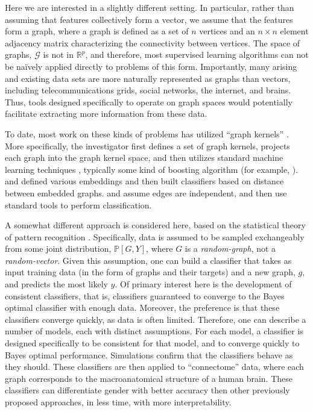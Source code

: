 \documentclass[10pt,journal,cspaper,compsoc]{IEEEtran}
\providecommand{\mc}[1]{\mathcal{#1}}
\newcommand{\Real}{\mathbb{R}}
\newcommand{\PP}{\mathbb{P}}
\begin{document}
Here we are interested in a slightly different setting.  In particular, rather than assuming that features collectively form a vector, we assume that the features form a graph, where a graph is defined as a set of $n$ vertices and an $n \times n$ element adjacency matrix characterizing the connectivity between vertices.  The space of graphs, $\mc{G}$ is not in $\Real^p$, and therefore, most supervised learning algorithms can not be na\"{i}vely applied directly to problems of this form.  Importantly, many arising and existing data sets are more naturally represented as graphs than vectors, including telecommunications grids, social networks, the internet, and brains.  Thus, tools designed specifically to operate on graph spaces would potentially facilitate extracting more information from these data.

To date, most work on these kinds of problems has utilized ``graph kernels'' \cite{Gartner03}.  More specifically, the investigator first defines a set of graph kernels, projects each graph into the graph kernel space, and then utilizes standard machine learning techniques \cite{HastieFriedman01}, typically some kind of boosting algorithm \cite{FreundSchapire95} (for example, \cite{KashimaInokuchi02, KashimaInokuchi03, KudoMatsumoto04}). \cite{BunkeRiesen08} and \cite{RiesenBunke09} defined various embeddings and then built classifiers based on distance between embedded graphs. \cite{FlachLachiche04} and \cite{TrentinIorio09} assume edges are independent, and then use standard tools to perform classification.  

A somewhat different approach is considered here, based on the statistical theory of pattern recognition \cite{DGL96}.  Specifically, data is assumed to be sampled exchangeably from some joint distribution, $\PP[G,Y]$, where $G$ is a \emph{random-graph}, not a \emph{random-vector}.  Given this assumption, one can build a classifier that takes as input training data (in the form of graphs and their targets) and a new graph, $g$, and predicts the most likely $y$.  Of primary interest here is the development of consistent classifiers, that is, classifiers guaranteed to converge to the Bayes optimal classifier with enough data.  Moreover, the preference is that these classifiers converge quickly, as data is often limited.  Therefore, one can describe a number of models, each with distinct assumptions.  For each model, a classifier is designed specifically to be consistent for that model, and to converge quickly to Bayes optimal performance.  Simulations confirm that the classifiers behave as they should.  These classifiers are then applied to ``connectome'' data, where each graph corresponds to the macroanatomical structure of a human brain.  These classifiers can differentiate gender with better accuracy then other previously proposed approaches, in less time, with more interpretability.
\end{document}
